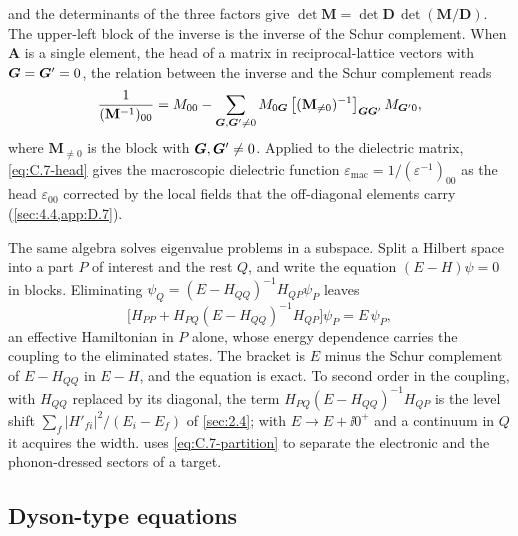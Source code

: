 and the determinants of the three factors give $\det\mathbf{M} = \det\mathbf{D}\,\det(\mathbf{M}/\mathbf{D})$.
The upper-left block of the inverse is the inverse of the Schur complement. When $\mathbf{A}$ is a single element, the head of a matrix in reciprocal-lattice vectors with $\bm{G} = \bm{G}' = 0$, the relation between the inverse and the Schur complement reads
\begin{equation}
  \frac{1}{(\mathbf{M}^{-1})_{00}} = M_{00} - \sum_{\bm{G},\bm{G}'\neq0}M_{0\bm{G}}\,\bigl[(\mathbf{M}_{\neq0})^{-1}\bigr]_{\bm{G}\bm{G}'}\,M_{\bm{G}'0} ,
  \label{eq:C.7-head}
\end{equation}
where $\mathbf{M}_{\neq0}$ is the block with $\bm{G}, \bm{G}' \neq 0$. Applied to the dielectric matrix, \cref{eq:C.7-head} gives the macroscopic dielectric function $\varepsilon_{\mathrm{mac}} = 1/(\varepsilon^{-1})_{00}$ as the head $\varepsilon_{00}$ corrected by the local fields that the off-diagonal elements carry (\cref{sec:4.4,app:D.7}).

The same algebra solves eigenvalue problems in a subspace. Split a Hilbert space into a part $P$ of interest and the rest $Q$, and write the equation $(E - H)\psi = 0$ in blocks. Eliminating $\psi_Q = (E - H_{QQ})^{-1}H_{QP}\psi_P$ leaves
\begin{equation}
  \bigl[H_{PP} + H_{PQ}(E - H_{QQ})^{-1}H_{QP}\bigr]\psi_P = E\,\psi_P ,
  \label{eq:C.7-partition}
\end{equation}
an effective Hamiltonian in $P$ alone, whose energy dependence carries the coupling to the eliminated states. The bracket is $E$ minus the Schur complement of $E - H_{QQ}$ in $E - H$, and the equation is exact. To second order in the coupling, with $H_{QQ}$ replaced by its diagonal, the term $H_{PQ}(E - H_{QQ})^{-1}H_{QP}$ is the level shift $\sum_f|H'_{fi}|^2/(E_i - E_f)$ of \cref{sec:2.4}; with $E \to E + \ii0^+$ and a continuum in $Q$ it acquires the width.  uses \cref{eq:C.7-partition} to separate the electronic and the phonon-dressed sectors of a target.

\subsection{Dyson-type equations}

